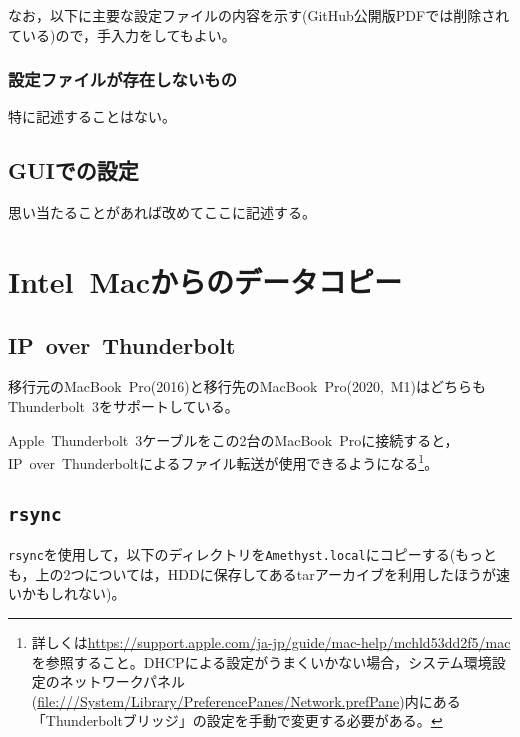 \documentclass[b5j,titlepage]{ltjsarticle}
\begin{document}
				なお，以下に主要な設定ファイルの内容を示す(GitHub公開版PDFでは削除されている)ので，手入力をしてもよい。



			\subsubsection{設定ファイルが存在しないもの}
				特に記述することはない。
				
		\subsection{GUIでの設定}
			思い当たることがあれば改めてここに記述する。

	\clearpage
	
	\section{Intel\ Macからのデータコピー}
		\subsection{IP\ over\ Thunderbolt}
			移行元のMacBook\ Pro(2016)と移行先のMacBook\ Pro(2020,\ M1)はどちらもThunderbolt\ 3をサポートしている。

			Apple\ Thunderbolt\ 3ケーブルをこの2台のMacBook\ Proに接続すると，IP\ over\ Thunderboltによるファイル転送が使用できるようになる\footnote{詳しくは\protect\url{https://support.apple.com/ja-jp/guide/mac-help/mchld53dd2f5/mac}を参照すること。DHCPによる設定がうまくいかない場合，システム環境設定のネットワークパネル(\protect\url{file:///System/Library/PreferencePanes/Network.prefPane})内にある「Thunderboltブリッジ」の設定を手動で変更する必要がある。}。

		\subsection{\texttt{rsync}}
			\texttt{rsync}を使用して，以下のディレクトリを\texttt{Amethyst.local}にコピーする(もっとも，上の2つについては，HDDに保存してあるtarアーカイブを利用したほうが速いかもしれない)。
\end{document}
